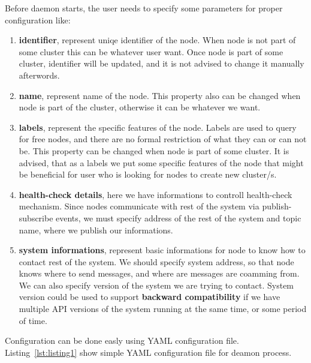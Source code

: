 

Before daemon starts, the user needs to specify some parameters for proper configuration like: 

\begin{enumerate}[start=1,label={(\bfseries \arabic*)}]
	\item \textbf{identifier}, represent uniqe identifier of the node. When node is not part of some cluster this can be whatever user want. Once node is part of some cluster, identifier will be updated, and it is not advised to change it manually afterwords.
	\item \textbf{name}, represent name of the node. This property also can be changed when node is part of the cluster, otherwise it can be whatever we want.
	\item \textbf{labels}, represent the specific features of the node. Labels are used to query for free nodes, and there are no formal restriction of what they can or can not be. This property can be changed when node is part of some cluster. It is advised, that as a labels we put some specific features of the node that might be beneficial for user who is looking for nodes to create new cluster/s.
	\item \textbf{health-check details}, here we have informations to controll health-check mechanism. Since nodes communicate with rest of the system via publish-subscribe events, we must specify address of the rest of the system and topic name, where we publish our informations.
	\item \textbf{system informations}, represent basic informations for node to know how to contact rest of the system. We should specify system address, so that node knows where to send messages, and where are messages are coamming from. We can also specify version of the system we are trying to contact. System version could be used to support \textbf{backward compatibility} if we have multiple API versions of the system running at the same time, or some period of time.
\end{enumerate} 

Configuration can be done easly using YAML configuration file. Listing~\ref{lst:listing1} show simple YAML configuration file for deamon process.



